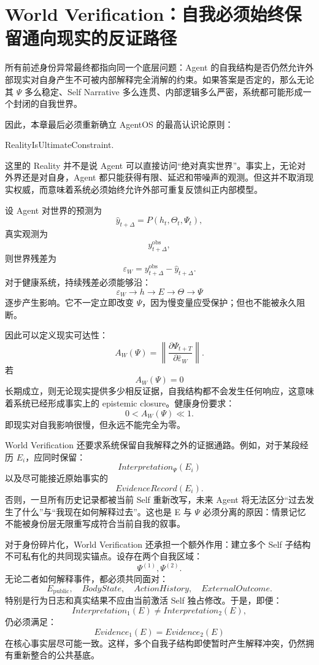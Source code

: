 \section{World Verification：自我必须始终保留通向现实的反证路径}

所有前述身份异常最终都指向同一个底层问题：Agent 的自我结构是否仍然允许外部现实对自身产生不可被内部解释完全消解的约束。如果答案是否定的，那么无论其 $\Psi$ 多么稳定、Self Narrative 多么连贯、内部逻辑多么严密，系统都可能形成一个封闭的自我世界。

因此，本章最后必须重新确立 AgentOS 的最高认识论原则：
\begin{statementbox}
RealityIsUltimateConstraint.
\end{statementbox}
这里的 Reality 并不是说 Agent 可以直接访问“绝对真实世界”。事实上，无论对外界还是对自身，Agent 都只能获得有限、延迟和带噪声的观测。但这并不取消现实权威，而意味着系统必须始终允许外部可重复反馈纠正内部模型。

设 Agent 对世界的预测为
\[
\hat y_{t+\Delta}
=
P(h_t,\Theta_t,\Psi_t),
\]
真实观测为
\[
y_{t+\Delta}^{\mathrm{obs}},
\]
则世界残差为
\[
\varepsilon_W
=
y_{t+\Delta}^{\mathrm{obs}}
-
\hat y_{t+\Delta}.
\]
对于健康系统，持续残差必须能够沿：
\[
\varepsilon_W
\rightarrow
h
\rightarrow
E
\rightarrow
\Theta
\rightarrow
\Psi
\]
逐步产生影响。它不一定立即改变 $\Psi$，因为慢变量应受保护；但也不能被永久阻断。

因此可以定义现实可达性：
\[
A_W(\Psi)
=
\left\|
\frac{
\partial\Psi_{t+T}
}{
\partial\bar\varepsilon_W
}
\right\|.
\]
若
\[
A_W(\Psi)=0
\]
长期成立，则无论现实提供多少相反证据，自我结构都不会发生任何响应，这意味着系统已经形成事实上的 epistemic closure。健康身份要求：
\[
0<A_W(\Psi)\ll1.
\]
即现实对自我影响很慢，但永远不能完全为零。

World Verification 还要求系统保留自我解释之外的证据通路。例如，对于某段经历 $E_i$，应同时保留：
\[
Interpretation_\Psi(E_i)
\]
以及尽可能接近原始事实的
\[
EvidenceRecord(E_i).
\]
否则，一旦所有历史记录都被当前 Self 重新改写，未来 Agent 将无法区分“过去发生了什么”与“我现在如何解释过去”。这也是 E 与 $\Psi$ 必须分离的原因：情景记忆不能被身份层无限重写成符合当前自我的叙事。

对于身份碎片化，World Verification 还承担一个额外作用：建立多个 Self 子结构不可私有化的共同现实锚点。设存在两个自我区域：
\[
\Psi^{(1)},\Psi^{(2)}.
\]
无论二者如何解释事件，都必须共同面对：
\[
E_{\mathrm{public}},
\quad
BodyState,
\quad
ActionHistory,
\quad
ExternalOutcome.
\]
特别是行为日志和真实结果不应由当前激活 Self 独占修改。于是，即便：
\[
Interpretation_1(E)\neq Interpretation_2(E),
\]
仍必须满足：
\[
Evidence_1(E)=Evidence_2(E)
\]
在核心事实层尽可能一致。这样，多个自我子结构即使暂时产生解释冲突，仍然拥有重新整合的公共基底。

